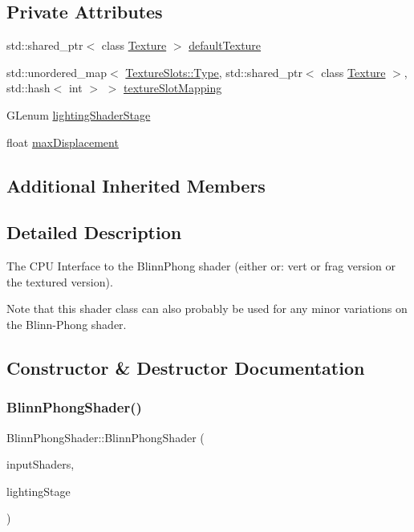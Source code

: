 \subsection*{Private Attributes}
\begin{DoxyCompactItemize}
\item 
std\+::shared\+\_\+ptr$<$ class \hyperlink{class_texture}{Texture} $>$ \hyperlink{class_blinn_phong_shader_a2335cf5c2d95098a94f9f2e888b329f3}{default\+Texture}
\item 
std\+::unordered\+\_\+map$<$ \hyperlink{struct_blinn_phong_shader_1_1_texture_slots_a98940b49ba855ee47d61a6243c05c34d}{Texture\+Slots\+::\+Type}, std\+::shared\+\_\+ptr$<$ class \hyperlink{class_texture}{Texture} $>$, std\+::hash$<$ int $>$ $>$ \hyperlink{class_blinn_phong_shader_a7467b1de2650fd04ea63ed5f8aeedc59}{texture\+Slot\+Mapping}
\item 
G\+Lenum \hyperlink{class_blinn_phong_shader_a942775771a09fd5553409bdb44ec32ac}{lighting\+Shader\+Stage}
\item 
float \hyperlink{class_blinn_phong_shader_a9e5e58c4901d48b315e94d15fd504a8c}{max\+Displacement}
\end{DoxyCompactItemize}
\subsection*{Additional Inherited Members}


\subsection{Detailed Description}
The C\+PU Interface to the Blinn\+Phong shader (either or\+: vert or frag version or the textured version). 

Note that this shader class can also probably be used for any minor variations on the Blinn-\/\+Phong shader. 

\subsection{Constructor \& Destructor Documentation}
\hypertarget{class_blinn_phong_shader_a2a13c983ffcc8d95ffe1a431bb2b1fb6}{}\label{class_blinn_phong_shader_a2a13c983ffcc8d95ffe1a431bb2b1fb6} 
\subsubsection{\texorpdfstring{Blinn\+Phong\+Shader()}{BlinnPhongShader()}}
{\footnotesize\ttfamily Blinn\+Phong\+Shader\+::\+Blinn\+Phong\+Shader (\begin{DoxyParamCaption}\item[{const std\+::unordered\+\_\+map$<$ G\+Lenum, std\+::string $>$ \&}]{input\+Shaders,  }\item[{G\+Lenum}]{lighting\+Stage }\end{DoxyParamCaption})}



